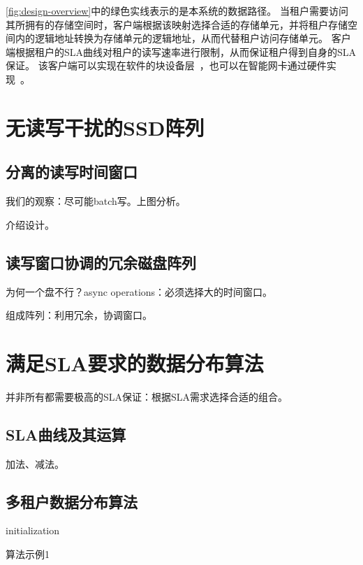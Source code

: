 \autoref{fig:design-overview}中的绿色实线表示的是本系统的数据路径。
当租户需要访问其所拥有的存储空间时，客户端根据该映射选择合适的存储单元，并将租户存储空间内的逻辑地址转换为存储单元的逻辑地址，从而代替租户访问存储单元。
客户端根据租户的SLA曲线对租户的读写速率进行限制，从而保证租户得到自身的SLA保证。
该客户端可以实现在软件的块设备层~\cite{linuxblock}，也可以在智能网卡通过硬件实现~\cite{bluefield}。

\section{无读写干扰的SSD阵列}
\label{sec:design-array}

\subsection{分离的读写时间窗口}
\label{sec:design-array-isorw}

我们的观察：尽可能batch写。上图分析。

介绍设计。

\subsection{读写窗口协调的冗余磁盘阵列}
\label{sec:design-array-composition}

为何一个盘不行？async operations：必须选择大的时间窗口。

组成阵列：利用冗余，协调窗口。

\section{满足SLA要求的数据分布算法}
\label{sec:design-allocation}

并非所有都需要极高的SLA保证：根据SLA需求选择合适的组合。

\subsection{SLA曲线及其运算}
\label{sec:design-allocation-sla-arithmetic}

加法、减法。

\subsection{多租户数据分布算法}
\label{sec:design-allocation-algo}

\begin{algorithm}[h]
  \SetAlgoLined

  initialization\;
  \caption{算法示例1}
  \label{algo:algorithm1}
\end{algorithm}